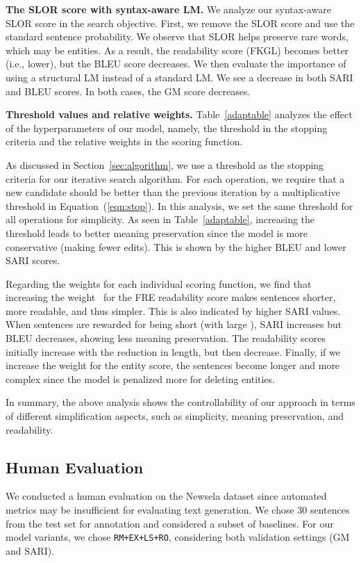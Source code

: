 \documentclass[11pt,a4paper]{article}
\begin{document}
\textbf{The SLOR score with syntax-aware LM.}
We analyze our syntax-aware SLOR score in the search objective. First, we remove the SLOR score and use the standard sentence probability. We observe that SLOR helps preserve rare words, which may be entities. As a result,
the readability score (FKGL) becomes better (i.e., lower), but the BLEU score decreases. 
We then evaluate the importance of using a structural LM instead of a standard LM. We see a decrease in both SARI and BLEU scores. In both cases, the GM score decreases.

\textbf{Threshold values and relative weights.}
Table~\ref{adaptable} analyzes the effect of the hyperparameters of our model, namely, the threshold in the stopping criteria and the relative weights in the scoring function.

As discussed in Section~\ref{sec:algorithm}, we use a threshold as the stopping criteria for our iterative search algorithm. For each operation, we require that a new candidate should be better than the previous iteration by a multiplicative threshold  in Equation~(\ref{eqn:stop}). In this analysis, we set the same threshold for all operations for simplicity.
As seen in Table~\ref{adaptable}, 
increasing the threshold leads to better meaning preservation since the model is more conservative (making fewer edits). This is shown by the higher BLEU and lower SARI scores. 

Regarding the weights for each individual scoring function, we find that increasing the weight~ for the FRE readability score makes sentences shorter, more readable, and thus simpler. This is also indicated by  higher SARI values. 
When sentences are rewarded for being short (with large ), SARI increases but BLEU decreases, showing less meaning preservation. 
The readability scores initially increase with the reduction in length, but then decrease. 
Finally, if we increase the weight  for the entity score, the sentences become longer and more complex since the model is penalized more for deleting entities. 

In summary, the above analysis shows the controllability of our approach in terms of different simplification aspects, such as simplicity, meaning preservation, and readability.


\subsection{Human Evaluation}

We conducted a human evaluation on the Newsela dataset  since automated metrics may be insufficient for evaluating text generation. We chose 30 sentences from the test set for annotation and considered a subset of baselines. For our model variants, we chose {\tt RM+EX+LS+RO}, considering both validation settings (GM and SARI). 
\end{document}

